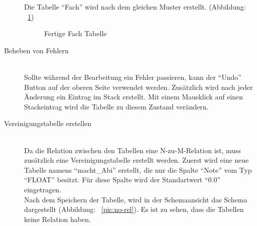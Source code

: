 \begin{description}
Die Tabelle ``Fach'' wird nach dem gleichen Muster erstellt. (Abbildung: ~\ref{pic:table-fach})

\begin{figure}[ht]
        \centering
        \caption{Fertige Fach Tabelle}
        \label{pic:table-fach}
\end{figure}

\item[Beheben von Fehlern] \hfill\\
Sollte während der Bearbeitung ein Fehler passieren, kann der ``Undo'' Button auf der oberen Seite verwendet werden. Zusätzlich wird nach jeder Änderung ein Eintrag im Stack erstellt. Mit einem Mausklick auf einen Stackeintrag wird die Tabelle zu diesem Zustand verändern.

\item[Vereinigungstabelle erstellen] \hfill\\
Da die Relation zwischen den Tabellen eine N-zu-M-Relation ist, muss zusätzlich eine Vereinigungstabelle erstellt werden.
Zuerst wird eine neue Tabelle namens ``macht\_\-Abi'' erstellt, die nur die Spalte ``Note'' vom Typ ``FLOAT'' besitzt. Für diese Spalte wird der Standartwert ``0.0'' eingetragen. \\
Nach dem Speichern der Tabelle, wird in der Schemaansicht das Schema dargestellt (Abbildung: ~\ref{pic:no-rel}). Es ist zu sehen, dass die Tabellen keine Relation haben.



\end{description}
